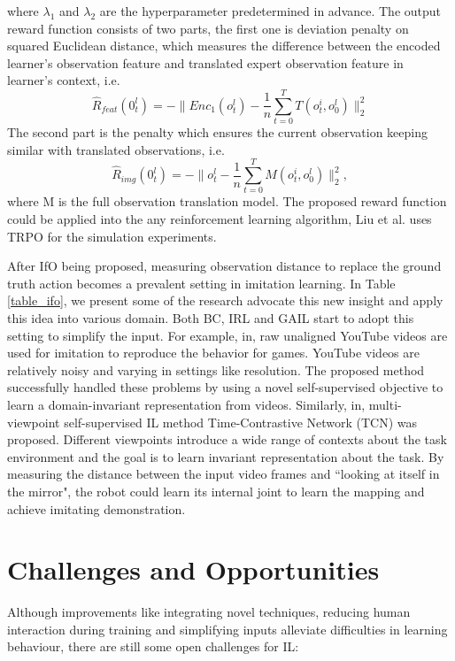 \documentclass[acmsmall]{acmart}
\begin{document}
where $\lambda_1$ and $\lambda_2$ are the hyperparameter predetermined in advance.  The output reward function consists of two parts, the first one is deviation penalty on squared Euclidean distance, which measures the difference between the encoded learner's observation feature and translated expert observation feature in learner's context, i.e. 
\[
\hat{R}_{feat} (0_t^l) = -\lVert Enc_1 (o_t^l)-\frac{1}{n}\sum_{t=0}^T T(o_t^i,o_0^l)\rVert_2^2
\]The second part is the penalty which ensures the current observation keeping similar with translated observations, i.e. 
\[
\hat{R}_{img} (0_t^l) = -\lVert o_t^l-\frac{1}{n}\sum_{t=0}^T M(o_t^i,o_0^l)\rVert_2^2,
\] 
where M is the full observation translation model. The proposed reward function could be applied into the any reinforcement learning algorithm, Liu et al. uses TRPO\cite{schulmanTrustRegionPolicy2017} for the simulation experiments. 

After IfO being proposed, measuring observation distance to replace the ground truth action becomes a prevalent setting in imitation learning. In Table \ref{table_ifo}, we present some of the research advocate this new insight and apply this idea into various domain. Both BC, IRL and GAIL start to adopt this setting to simplify the input. For example, in\cite{aytarPlayingHardExploration2018}, raw unaligned YouTube videos are used for imitation to reproduce the behavior for games. YouTube videos are relatively noisy and varying in settings like resolution. The proposed method successfully handled these problems by using a novel self-supervised objective to learn a domain-invariant representation from videos. Similarly, in\cite{sermanetTimeContrastiveNetworksSelfSupervised2018}, multi-viewpoint self-supervised IL method Time-Contrastive Network (TCN) was proposed. Different viewpoints introduce a wide range of contexts about the task environment and the goal is to learn invariant representation about the task. By measuring the distance between the input video frames and ``looking at itself in the mirror", the robot could learn its internal joint to learn the mapping and achieve imitating demonstration. 

\section{Challenges and Opportunities}\label{future}
Although improvements like integrating novel techniques, reducing human interaction during training and simplifying inputs alleviate difficulties in learning behaviour, there are still some open challenges for IL:
\end{document}
